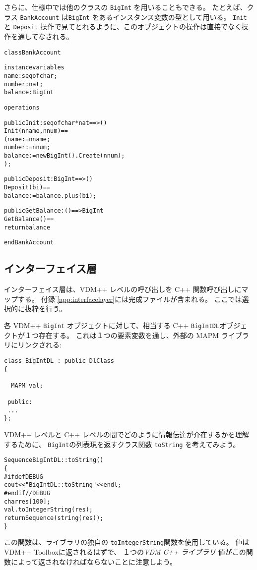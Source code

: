 \documentclass[\pformat,12pt]{jarticle}
\newcommand{\vdmcpplib}{\textit{VDM C++ ライブラリ}}
\begin{document}
さらに、仕様中では他のクラスの \texttt{BigInt} を用いることもできる。
たとえば、クラス \texttt{BankAccount} は\texttt{BigInt} をあるインスタンス変数の型として用いる。
 \texttt{Init} と \texttt{Deposit} 操作で見てとれるように、このオブジェクトの操作は直接でなく操作を通してなされる。

\begin{alltt}
\textsf{class} BankAccount

\textsf{instance} \textsf{variables}
  name : \textsf{seq} \textsf{of} \textsf{char};
  number : \textsf{nat};
  balance : BigInt

\textsf{operations}

\textsf{public} Init : \textsf{seq} \textsf{of} \textsf{char} * \textsf{nat} ==> ()
Init(nname, nnum) ==
( name := nname;
  number := nnum;
  balance := new BigInt().Create(nnum);
);

\textsf{public} Deposit : BigInt ==> ()
Deposit(bi) ==
  balance := balance.plus(bi);

\textsf{public} GetBalance : () ==> BigInt
GetBalance() ==
  \textsf{return} balance

\textsf{end} BankAccount
\end{alltt}


\subsection{インターフェイス層}

インターフェイス層は、VDM++ レベルの呼び出しを C++ 関数呼び出しにマップする。
付録‾\ref{app:interfacelayer}には完成ファイルが含まれる。
ここでは選択的に抜粋を行う。

各 VDM++ \texttt{BigInt} オブジェクトに対して、相当する C++ \texttt{BigIntDL}オブジェクトが１つ存在する。 
これは１つの要素変数を通し、外部の MAPM ライブラリにリンクされる: 
\begin{verbatim}
class BigIntDL : public DlClass
{

  MAPM val;
 
 public:
 ...
};
\end{verbatim}



 VDM++ レベルと C++ レベルの間でどのように情報伝達が介在するかを理解するために、 \texttt{BigInt}の列表現を返すクラス関数 \texttt{toString} を考えてみよう。

\begin{alltt}
Sequence BigIntDL::toString()
\{
\#ifdef DEBUG
  cout << "BigIntDL::toString" << endl;
\#endif //DEBUG
  char res[100];
  val.toIntegerString(res);
  return Sequence(string(res));
\}
\end{alltt}
この関数は、ライブラリの独自の \texttt{toIntegerString}関数を使用している。 
値は VDM++ Toolboxに返されるはずで、 １つの{\vdmcpplib} 値がこの関数によって返されなければならないことに注意しよう。 
\end{document}
